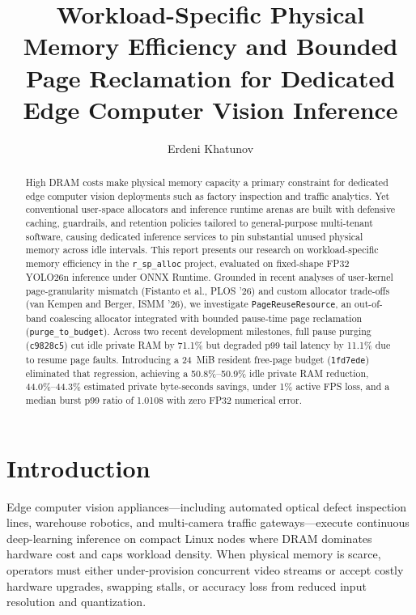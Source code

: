 \documentclass[sigconf,screen,nonacm]{acmart}
\begin{document}
\title{Workload-Specific Physical Memory Efficiency and Bounded Page Reclamation for Dedicated Edge Computer Vision Inference}

\author{Erdeni Khatunov}

\begin{abstract}
High DRAM costs make physical memory capacity a primary constraint for dedicated edge computer vision deployments such as factory inspection and traffic analytics. Yet conventional user-space allocators and inference runtime arenas are built with defensive caching, guardrails, and retention policies tailored to general-purpose multi-tenant software, causing dedicated inference services to pin substantial unused physical memory across idle intervals. This report presents our research on workload-specific memory efficiency in the \texttt{r\_sp\_alloc} project, evaluated on fixed-shape FP32 YOLO26n inference under ONNX Runtime. Grounded in recent analyses of user-kernel page-granularity mismatch (Fistanto et al., PLOS '26) and custom allocator trade-offs (van Kempen and Berger, ISMM '26), we investigate \texttt{PageReuseResource}, an out-of-band coalescing allocator integrated with bounded pause-time page reclamation (\texttt{purge\_to\_budget}). Across two recent development milestones, full pause purging (\texttt{c9828c5}) cut idle private RAM by 71.1\% but degraded p99 tail latency by 11.1\% due to resume page faults. Introducing a 24~MiB resident free-page budget (\texttt{1fd7ede}) eliminated that regression, achieving a 50.8\%--50.9\% idle private RAM reduction, 44.0\%--44.3\% estimated private byte-seconds savings, under 1\% active FPS loss, and a median burst p99 ratio of 1.0108 with zero FP32 numerical error.
\end{abstract}


\maketitle

\section{Introduction}
Edge computer vision appliances---including automated optical defect inspection lines, warehouse robotics, and multi-camera traffic gateways---execute continuous deep-learning inference on compact Linux nodes where DRAM dominates hardware cost and caps workload density. When physical memory is scarce, operators must either under-provision concurrent video streams or accept costly hardware upgrades, swapping stalls, or accuracy loss from reduced input resolution and quantization.
\end{document}
